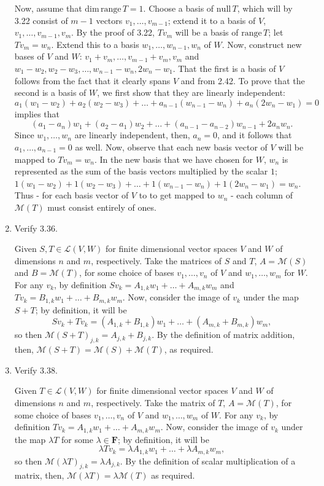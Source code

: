 \documentclass{book}
\begin{document}
\begin{enumerate}
Now, assume that \(\textrm{dim} \, \textrm{range} \, T = 1\).  Choose a basis of \(\textrm{null} \, T\), which will by 3.22 consist of \(m-1\) vectors \(v_1,\dots,v_{m-1}\); extend it to a basis of \(V\), \(v_1,\dots,v_{m-1},v_m\).  By the proof of 3.22, \(Tv_m\) will be a basis of \(\textrm{range} \, T\); let \(Tv_m=w_n\).  Extend this to a basis \(w_1,\dots,w_{n-1},w_n\) of \(W\).  Now, construct new bases of \(V\) and \(W\): \(v_1+v_m,\dots,v_{m-1}+v_m,v_m\) and \(w_1-w_2,w_2-w_3,\dots,w_{n-1}-w_n,2w_n-w_1\).  That the first is a basis of \(V\) follows from the fact that it clearly spans \(V\) and from 2.42.  To prove that the second is a basis of \(W\), we first show that they are linearly independent: \[a_1(w_1-w_2)+a_2(w_2-w_3)+\dots+a_{n-1}(w_{n-1}-w_n)+a_n(2w_n-w_1)=0\] implies that \[(a_1-a_n)w_1+(a_2-a_1)w_2+\dots+(a_{n-1}-a_{n-2})w_{n-1}+2a_nw_n.\] Since \(w_1,\dots,w_n\) are linearly independent, then, \(a_n=0\), and it follows that \(a_1,\dots,a_{n-1}=0\) as well.  Now, observe that each new basis vector of \(V\) will be mapped to \(Tv_m=w_n\).  In the new basis that we have chosen for \(W\), \(w_n\) is represented as the sum of the basis vectors multiplied by the scalar \(1\); \(1(w_1-w_2)+1(w_2-w_3)+\dots+1(w_{n-1}-w_n)+1(2w_n-w_1)=w_n\).  Thus - for each basis vector of \(V\) to to get mapped to \(w_n\) - each column of \(\mathcal{M}(T)\) must consist entirely of ones.

\item Verify 3.36.

Given \(S,T \in \mathcal{L}(V,W)\) for finite dimensional vector spaces \(V\) and \(W\) of dimensions \(n\) and \(m\), respectively.  Take the matrices of \(S\) and \(T\), \(A=\mathcal{M}(S)\) and \(B=\mathcal{M}(T)\), for some choice of bases \(v_1,\dots,v_n\) of \(V\) and \(w_1,\dots,w_m\) for \(W\).  For any \(v_k\), by definition \(Sv_k=A_{1,k}w_1+\dots+A_{m,k}w_m\) and \(Tv_k=B_{1,k}w_1+\dots+B_{m,k}w_m\).  Now, consider the image of \(v_k\) under the map \(S+T\); by definition, it will be \[Sv_k+Tv_k=(A_{1,k}+B_{1,k})w_1+\dots+(A_{m,k}+B_{m,k})w_m,\] so then \(\mathcal{M}(S+T)_{j,k}=A_{j,k}+B_{j,k}\).  By the definition of matrix addition, then, \(\mathcal{M}(S+T)=\mathcal{M}(S)+\mathcal{M}(T)\), as required.  

\item Verify 3.38.

Given \(T \in \mathcal{L}(V,W)\) for finite dimensional vector spaces \(V\) and \(W\) of dimensions \(n\) and \(m\), respectively.  Take the matrix of \(T\), \(A=\mathcal{M}(T)\), for some choice of bases \(v_1,\dots,v_n\) of \(V\) and \(w_1,\dots,w_m\) of \(W\).  For any \(v_k\), by definition \(Tv_k=A_{1,k}w_1+\dots+A_{m,k}w_m\).  Now, consider the image of \(v_k\) under the map \(\lambda T\) for some \(\lambda \in \textbf{F}\); by definition, it will be \[\lambda Tv_k = \lambda A_{1,k}w_1+\dots+\lambda A_{m,k}w_m,\] so then \(\mathcal{M}(\lambda T)_{j,k}=\lambda A_{j,k}\).  By the definition of scalar multiplication of a matrix, then, \(\mathcal{M}(\lambda T)=\lambda \mathcal{M}(T)\) as required.


\end{enumerate}
\end{document}
